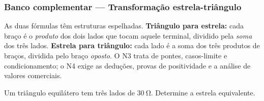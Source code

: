
\subsubsection*{Banco complementar --- Transformação estrela-triângulo}

\begin{atencao}
As duas fórmulas têm estruturas espelhadas. \textbf{Triângulo para estrela:}
cada braço é o \emph{produto} dos dois lados que tocam aquele terminal, dividido
pela \emph{soma} dos três lados. \textbf{Estrela para triângulo:} cada lado é a
soma dos três produtos de braços, dividida pelo braço \emph{oposto}. O N3 trata
de pontes, casos-limite e condicionamento; o N4 exige as deduções, provas de
positividade e a análise de valores comerciais.
\end{atencao}

\blocofixacao

\begin{questao}[1]{}
Um triângulo equilátero tem três lados de $\SI{30}{\ohm}$. Determine a estrela
equivalente.
\end{questao}

